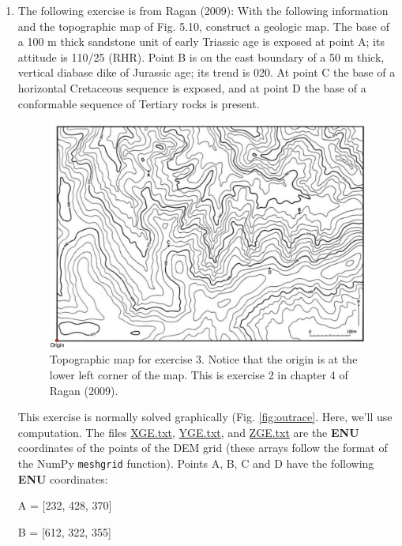 \documentclass[a4paper , 12pt]{book}
\newcommand{\code}[1]{\colorbox{light-gray}{\texttt{#1}}}
\begin{document}
\begin{enumerate}
    \item The following exercise is from Ragan (2009): With the following information and the topographic map of Fig. 5.10, construct a geologic map. The base of a 100 m thick sandstone unit of early Triassic age is exposed at point A; its attitude is 110/25 (RHR). Point B is on the east boundary of a 50 m thick, vertical diabase dike of Jurassic age; its trend is 020. At point C the base of a horizontal Cretaceous sequence is exposed, and at point D the base of a conformable sequence of Tertiary rocks is present.
    
    \begin{figure}[ht]
    \centering
    \includegraphics[width=13.5cm]{ch5f15.pdf}
    \caption{Topographic map for exercise 3. Notice that the origin is at the lower left corner of the map. This is exercise 2 in chapter 4 of Ragan (2009).}
    \end{figure}
    
    This exercise is normally solved graphically (Fig. \ref{fig:outrace}. Here, we'll use computation. The files \href{https://github.com/nfcd/compGeo/blob/master/source/data/ch5-exercise3/XGE.txt}{XGE.txt}, \href{https://github.com/nfcd/compGeo/blob/master/source/data/ch5-exercise3/YGE.txt}{YGE.txt}, and \href{https://github.com/nfcd/compGeo/blob/master/source/data/ch5-exercise3/ZGE.txt}{ZGE.txt} are the \textbf{ENU} coordinates of the points of the DEM grid (these arrays follow the format of the NumPy \code{meshgrid} function). Points A, B, C and D have the following \textbf{ENU} coordinates:
    
    A = [232, 428, 370]
    
    B = [612, 322, 355]
    

\end{enumerate}
\end{document}
